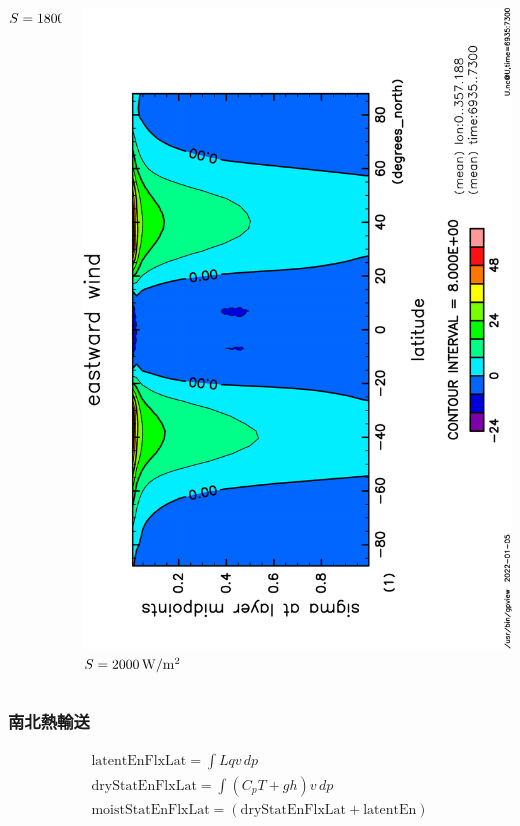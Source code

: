 \documentclass[aspectratio=149,9pt,fleqn]{beamer}
\begin{document}
\begin{frame}
\begin{columns}[T]
\begin{column}{.3\textwidth}
			\(S=1800\hmu{W/m^2}\)
		\end{column}
		\begin{column}{.3\textwidth}
			\centering
			\includegraphics[height=\textwidth,angle=-90]{S2000/U,time=6935:7300-crop.pdf}
			\(S=2000\hmu{W/m^2}\)
		\end{column}
	\end{columns}
\end{frame}

\begin{frame}
	\frametitle{南北熱輸送}
	\begin{gather*}
		\mathrm{latentEnFlxLat}=\int Lqv\,dp\tag{潜熱輸送}\\
		\mathrm{dryStatEnFlxLat}=\int (C_pT+gh)v\,dp\tag{乾燥静的エネルギー}\\
		\mathrm{moistStatEnFlxLat}=(\mathrm{dryStatEnFlxLat}+\mathrm{latentEn})\tag{湿潤静的エネルギー}
	\end{gather*}
\end{frame}
\end{document}
